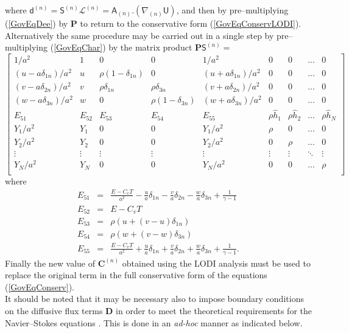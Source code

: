 \documentclass[dvips]{article}
\begin{document}
where ${\mathsf d}^{(n)} = {\mathsf S}^{(n)}{\mathcal L}^{(n)} =
{\mathsf A}_{(n)}.\left(\nabla_{(n)}{\mathsf U}\right)$, and
then by pre--multiplying (\ref{GovEqDee}) by ${\mathbf P}$ to return to
the conservative form (\ref{GovEqConservLODI}).  Alternatively the same
procedure may be carried out in a single step by pre--multiplying
(\ref{GovEqChar}) by the matrix product ${\mathbf P}{\mathsf S}^{(n)}=$
\begin{equation}
\left[
\begin{array}{ccccccccc}
1/a^{2} & 1 & 0 & 0 & 1/a^{2} & 0 & 0 & \ldots & 0 \\
(u-a\delta_{1n})/a^{2} & u & \rho(1-\delta_{1n}) & 0 &
(u+a\delta_{1n})/a^{2} & 0 & 0 & \ldots & 0 \\
(v-a\delta_{2n})/a^{2} & v & \rho\delta_{1n} & \rho\delta_{3n} &
(v+a\delta_{2n})/a^{2} & 0 & 0 & \ldots & 0 \\
(w-a\delta_{3n})/a^{2} & w & 0 & \rho(1-\delta_{3n}) &
(w+a\delta_{3n})/a^{2} & 0 & 0 & \ldots & 0 \\
E_{51} & E_{52} & E_{53} & E_{54} & E_{55} &
\rho\hat{h}_{1}& \rho\hat{h}_{2} & \ldots & \rho\hat{h}_{N} \\
Y_{1}/a^{2} & Y_{1} & 0 & 0 & Y_{1}/a^{2} & \rho & 0 & \ldots & 0 \\
Y_{2}/a^{2} & Y_{2} & 0 & 0 & Y_{2}/a^{2} & 0 & \rho & \ldots & 0 \\
\vdots & \vdots & \vdots & \vdots & \vdots & \vdots & \vdots & \ddots &
\vdots \\
Y_{N}/a^{2} & Y_{N} & 0 & 0 & Y_{N}/a^{2} & 0 & 0 & \ldots & \rho \\
\end{array}
\right]
\end{equation}
where
\begin{eqnarray}
E_{51} & = &
\frac{E-C_{v}T}{a^{2}}
-\frac{u}{a}\delta_{1n}-\frac{v}{a}\delta_{2n}-\frac{w}{a}\delta_{3n}
+\frac{1}{\gamma-1} \nonumber\\
E_{52} & = & E-C_{v}T \nonumber \\
E_{53} & = & \rho\left(u+(v-u)\delta_{1n}\right) \nonumber \\
E_{54} & = & \rho\left(w+(v-w)\delta_{3n}\right) \nonumber \\
E_{55} & = & \frac{E-C_{v}T}{a^{2}}
+\frac{u}{a}\delta_{1n}+\frac{v}{a}\delta_{2n}+\frac{w}{a}\delta_{3n}
+\frac{1}{\gamma-1}.
\end{eqnarray}
Finally the new value of ${\mathbf C}^{(n)}$ obtained using the LODI
analysis must be used to replace the original term in the
full conservative form of the equations (\ref{GovEqConserv}).\\[2mm]
It should be noted that it may be necessary also to impose boundary
conditions on the diffusive flux terms ${\mathbf D}$ in order to meet the
theoretical requirements for the Navier--Stokes equations \cite{PoinsotLele}.
This is done in an {\it ad-hoc} manner as indicated below.
\end{document}
